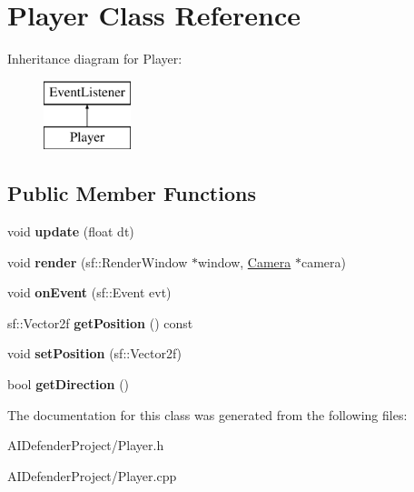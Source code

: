 \hypertarget{class_player}{}\section{Player Class Reference}
\label{class_player}
Inheritance diagram for Player\+:\begin{figure}[H]
\begin{center}
\leavevmode
\includegraphics[height=2.000000cm]{class_player}
\end{center}
\end{figure}
\subsection*{Public Member Functions}
\begin{DoxyCompactItemize}
\item 
\mbox{\label{class_player_ae7812e67381f4c26ae1b963eeaffc3a1}} 
void {\bfseries update} (float dt)
\item 
\mbox{\label{class_player_afc1d17f6c3dd5538f50fcc4b6474045e}} 
void {\bfseries render} (sf\+::\+Render\+Window $\ast$window, \hyperlink{class_camera}{Camera} $\ast$camera)
\item 
\mbox{\label{class_player_a1c2b2e4e48a2b5b705ccf03f9fa47153}} 
void {\bfseries on\+Event} (sf\+::\+Event evt)
\item 
\mbox{\label{class_player_a4f679a9d2fa60e76fe00d615dfe4d584}} 
sf\+::\+Vector2f {\bfseries get\+Position} () const
\item 
\mbox{\label{class_player_a64b65de6130f811ce670be4b0ca790b4}} 
void {\bfseries set\+Position} (sf\+::\+Vector2f)
\item 
\mbox{\label{class_player_a55ab1bb46619242418ef5c7d104efe23}} 
bool {\bfseries get\+Direction} ()
\end{DoxyCompactItemize}


The documentation for this class was generated from the following files\+:\begin{DoxyCompactItemize}
\item 
A\+I\+Defender\+Project/Player.\+h\item 
A\+I\+Defender\+Project/Player.\+cpp\end{DoxyCompactItemize}

